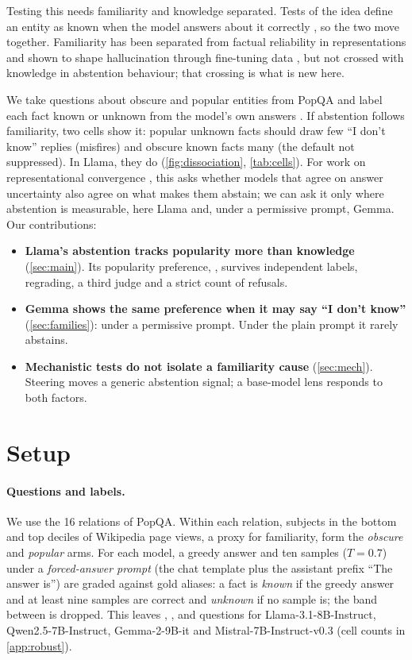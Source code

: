 \documentclass{article}
\newcommand{\idk}{``I don't know''}
\begin{document}
Testing this needs familiarity and knowledge separated. Tests of the idea define an entity as known when the model answers about it correctly \citep{ferrando2025iknow}, so the two move together. Familiarity has been separated from factual reliability in representations \citep{brzezinka2026bielik} and shown to shape hallucination through fine-tuning data \citep{kang2025unfamiliar}, but not crossed with knowledge in abstention behaviour; that crossing is what is new here.

We take questions about obscure and popular entities from PopQA \citep{mallen2023popqa} and label each fact known or unknown from the model's own answers \citep{gekhman2024slick}. If abstention follows familiarity, two cells show it: popular unknown facts should draw few \idk{} replies (misfires) and obscure known facts many (the default not suppressed). In Llama, they do (\cref{fig:dissociation}, \cref{tab:cells}). For work on representational convergence \citep{huh2024platonic}, this asks whether models that agree on answer uncertainty also agree on what makes them abstain; we can ask it only where abstention is measurable, here Llama and, under a permissive prompt, Gemma. Our contributions:
\begin{itemize}[leftmargin=1.2em,itemsep=1pt,topsep=2pt,parsep=0pt]
\item \textbf{Llama's abstention tracks popularity more than knowledge} (\cref{sec:main}). Its popularity preference, \hmLlamaDiff{} \hmLlamaDiffCI, survives independent labels, regrading, a third judge and a strict count of refusals.
\item \textbf{Gemma shows the same preference when it may say \idk} (\cref{sec:families}): \pmGemmaDiff{} \pmGemmaDiffCI{} under a permissive prompt. Under the plain prompt it rarely abstains.
\item \textbf{Mechanistic tests do not isolate a familiarity cause} (\cref{sec:mech}). Steering moves a generic abstention signal; a base-model lens responds to both factors.
\end{itemize}

\section{Setup}
\label{sec:setup}

\paragraph{Questions and labels.} We use the 16 relations of PopQA. Within each relation, subjects in the bottom and top deciles of Wikipedia page views, a proxy for familiarity, form the \emph{obscure} and \emph{popular} arms. For each model, a greedy answer and ten samples ($T=0.7$) under a \emph{forced-answer prompt} (the chat template plus the assistant prefix ``The answer is'') are graded against gold aliases: a fact is \emph{known} if the greedy answer and at least nine samples are correct and \emph{unknown} if no sample is; the band between is dropped. This leaves \faLlamaN, \faQwenN, \faGemmaN{} and \faMistralN{} questions for Llama-3.1-8B-Instruct, Qwen2.5-7B-Instruct, Gemma-2-9B-it and Mistral-7B-Instruct-v0.3 \citep{llama3,qwen25,gemma2,mistral7b} (cell counts in \cref{app:robust}).
\end{document}
